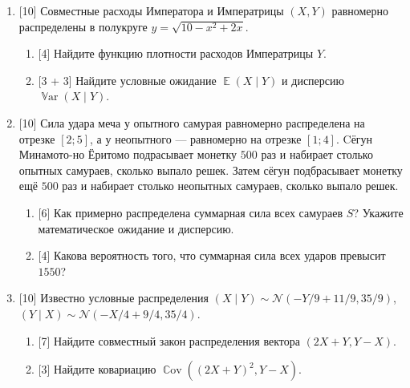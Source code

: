 \documentclass[12pt]{article}
\DeclareMathOperator{\Cov}{\mathbb{C}ov}
\DeclareMathOperator{\Var}{\mathbb{V}ar}
\DeclareMathOperator{\E}{\mathbb{E}}
\newcommand{\cN}{\mathcal{N}}
\begin{document}
\begin{enumerate}
    \item {[10]} Совместные расходы Императора и Императрицы $(X, Y)$ равномерно распределены в полукруге $y  = \sqrt{10 - x^2 + 2x}$.
    
    \begin{enumerate}
        \item {[4]} Найдите функцию плотности расходов Императрицы $Y$.
        \item {[3 + 3]} Найдите условные ожидание $\E(X \mid Y)$ и дисперсию $\Var(X \mid Y)$.
    \end{enumerate}

    \item {[10]} Сила удара меча у опытного самурая равномерно распределена на отрезке $[2; 5]$,
    а у неопытного — равномерно на отрезке $[1; 4]$.
    Cёгун Минамото-но Ёритомо подрасывает монетку $500$ раз и набирает столько опытных самураев, сколько выпало решек. 
    Затем сёгун подбрасывает монетку ещё $500$ раз и набирает столько неопытных самураев, сколько выпало решек.
    
    \begin{enumerate}
        \item {[6]} Как примерно распределена суммарная сила всех самураев $S$? Укажите математическое ожидание и дисперсию. 
        \item {[4]} Какова вероятность того, что суммарная сила всех ударов превысит $1550$?
    \end{enumerate}
    
    \item {[10]} Известно условные распределения $(X \mid Y) \sim \cN(-Y/9 + 11/9, 35/9)$, $(Y \mid X) \sim \cN(-X/4 + 9/4, 35/4)$.
    \begin{enumerate}
        \item {[7]} Найдите совместный закон распределения вектора $(2X + Y, Y - X)$.
        \item {[3]} Найдите ковариацию $\Cov((2X+Y)^2, Y - X)$.
    \end{enumerate}
    

\end{enumerate}
\end{document}
